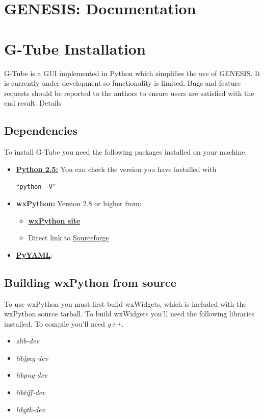 \documentclass[12pt]{article}
\begin{document}
\section*{GENESIS: Documentation}

\section*{G-Tube Installation}

G-Tube is a GUI implemented in Python which simplifies the use of GENESIS. It is currently under development so functionality is limited. Bugs and feature requests should be reported to the authors to ensure users are satisfied with the end result.
Details

\subsection*{Dependencies}

To install G-Tube you need the following packages installed on your machine.

\begin{itemize}
   \item {\href{http://python.org/download/}{\bf Python 2.5:}} You can check the version you have installed with
   
   ``{\tt python -V}''
   
   \item {\bf wxPython:} Version 2.8 or higher from:   
   \begin{itemize}
      \item \href{http://www.wxpython.org/download.php}{\bf wxPython site}
      \item Direct link to \href{https://sourceforge.net/projects/wxpython/files/}{Sourceforge}
   \end{itemize}
   \item \href{http://pyyaml.org/ }{\bf PyYAML}:
\end{itemize}

\subsection*{Building wxPython from source}

To use wxPython you must first build wxWidgets, which is included with the wxPython source tarball. To build wxWidgets you'll need the following libraries installed. To compile you'll need {\it g++}.

\begin{itemize}
   \item {\it zlib-dev}
   \item {\it libjpeg-dev}
   \item {\it libpng-dev}
   \item {\it libtiff-dev}
   \item {\it libgtk-dev}
\end{itemize}
\end{document}
